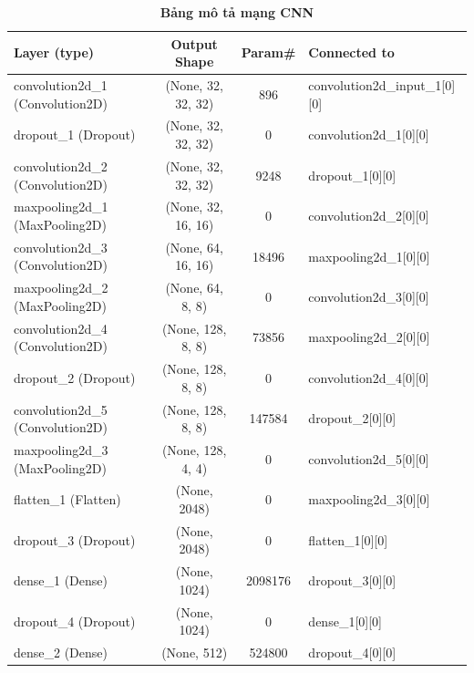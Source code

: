\documentclass[a4paper,12pt]{report}
\begin{document}
{\small
\begin{center}
\begin{longtable}{lccl}
\caption{\textbf{Bảng mô tả mạng CNN}}
\label{}
\endfirsthead
\endhead
\hline
	Layer (type)              &      Output Shape     &     Param\#   &  Connected to  \\
\hline
convolution2d\_1 (Convolution2D) & (None, 32, 32, 32) &   896    &     convolution2d\_input\_1[0][0]     \\
\hline
dropout\_1 (Dropout)          &    (None, 32, 32, 32)  &  0     &      convolution2d\_1[0][0]            \\
\hline
convolution2d\_2 (Convolution2D)&  (None, 32, 32, 32) &   9248   &     dropout\_1[0][0]          \\        
\hline
maxpooling2d\_1 (MaxPooling2D)   & (None, 32, 16, 16)&    0       &    convolution2d\_2[0][0]      \\      
\hline
convolution2d\_3 (Convolution2D) & (None, 64, 16, 16) &   18496   &    maxpooling2d\_1[0][0] \\             
\hline
maxpooling2d\_2 (MaxPooling2D)   & (None, 64, 8, 8)    &  0        &   convolution2d\_3[0][0] \\
\hline
convolution2d\_4 (Convolution2D) & (None, 128, 8, 8)  &   73856   &    maxpooling2d\_2[0][0]      \\       
\hline
dropout\_2 (Dropout)  &            (None, 128, 8, 8) &    0   &        convolution2d\_4[0][0]       \\     

\hline
convolution2d\_5 (Convolution2D)&  (None, 128, 8, 8) &    147584 &     dropout\_2[0][0]            \\      

\hline
maxpooling2d\_3 (MaxPooling2D) &   (None, 128, 4, 4) &    0   &        convolution2d\_5[0][0]     \\       

\hline
flatten\_1 (Flatten)        &      (None, 2048) &         0    &       maxpooling2d\_3[0][0]    \\        

\hline
dropout\_3 (Dropout)    &          (None, 2048)  &        0   &        flatten\_1[0][0]    \\              

\hline
dense\_1 (Dense)      &            (None, 1024)     &     2098176   &  dropout\_3[0][0]    \\              

\hline
dropout\_4 (Dropout)  &            (None, 1024)  &        0  &         dense\_1[0][0]      \\              
\hline
dense\_2 (Dense)       &           (None, 512)  &         524800&      dropout\_4[0][0]        \\          


\end{longtable}
\end{center}}
\end{document}
